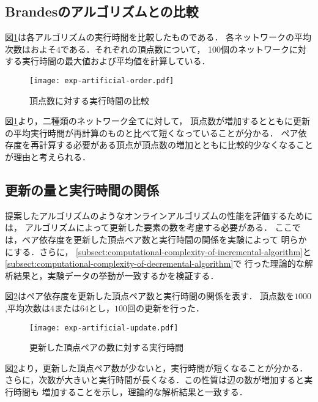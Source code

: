 \subsection{Brandesのアルゴリズムとの比較}

図\ref{fig:exp-artificial-order}は各アルゴリズムの実行時間を比較したものである．
各ネットワークの平均次数はおよそ$4$である．それぞれの頂点数について，
100個のネットワークに対する実行時間の最大値および平均値を計算している．

\begin{figure}[tb]
  \centering
  \texttt{[image: exp-artificial-order.pdf]}
  \caption{頂点数に対する実行時間の比較}
  \label{fig:exp-artificial-order}
\end{figure}

図\ref{fig:exp-artificial-order}より，二種類のネットワーク全てに対して，
頂点数が増加するとともに更新の平均実行時間が再計算のものと比べて短くなっていることが分かる．
ペア依存度を再計算する必要がある頂点が頂点数の増加とともに比較的少なくなることが理由と考えられる．

\subsection{更新の量と実行時間の関係}

提案したアルゴリズムのようなオンラインアルゴリズムの性能を評価するためには，
アルゴリズムによって更新した要素の数を考慮する必要がある．
\cite{Ramalingam1996,Lee2012,Pontecorvi2014}
ここでは，ペア依存度を更新した頂点ペア数と実行時間の関係を実験によって
明らかにする．さらに，
\ref{subsect:computational-complexity-of-incremental-algorithm}と
\ref{subsect:computational-complexity-of-decremental-algorithm}で
行った理論的な解析結果と，実験データの挙動が一致するかを検証する．

図\ref{fig:exp-artificial-update}はペア依存度を更新した頂点ペア数と実行時間の関係を表す．
頂点数を$1000$,平均次数は$4$または$64$とし，$100$回の更新を行った．

\begin{figure}[tb]
  \centering
  \texttt{[image: exp-artificial-update.pdf]}
  \caption{更新した頂点ペアの数に対する実行時間}
  \label{fig:exp-artificial-update}
\end{figure}

図\ref{fig:exp-artificial-update}より，更新した頂点ペア数が少ないと，実行時間が短くなることが分かる．
さらに，次数が大きいと実行時間が長くなる．この性質は辺の数が増加すると実行時間も
増加することを示し，理論的な解析結果と一致する．

